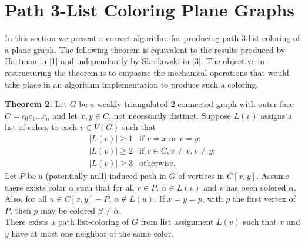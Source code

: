 \documentclass[12pt,a4paper]{article}
\begin{document}
\begin{comment}
  \node (1c2) at (1cm,1.25cm) {$c_2$};
  \node (1c3) at (2.25cm,1cm) {$c_3$};
  
  \node (c3) at (3.25cm,1cm) {$c_3$};
  \node (c4) at (4cm,0cm) {$c_4$};
  \node (c5) at (3.25cm,-1cm) {$c_5$};
  \node (c6) at (2cm,-1.25cm) {$c_6$};
  
  \node (2c6) at (1cm,-1.25cm) {$c_6$};
  \node (2c7) at (-0.25cm,-1cm) {$c_7$};
  
  \draw (0c1) -- (0c2); \draw (1c2) -- (1c3); \draw (c3) -- (c4) -- (c5) -- (c6) -- (c3);
  \draw (2c6) -- (2c7); \draw (c3)-- (c5) [dashed];
\end{tikzpicture}
\hfill\\
\hfill\\
\footnotesize{Removing $c_0$ and disecting into blocks with Theorem 2.}
\end{center}
\end{adjustwidth}
\hfill

\noindent Note that when applying Theorem 2, $G-c_0$ is $2$-connected
(i.e. $G-c_0=G_0$) if and only if Theorem 1 applies.

\end{comment}

\section*{Path 3-List Coloring Plane Graphs}

In this section we present a correct algorithm for producing path $3$-list coloring of a plane graph. The following
theorem is equivalent to the results produced by Hartman in [1] and independantly by Skrekovski in [3]. The objective in restructuring
the theorem is to empasize the mechanical operations that would take place in an algorithm implementation
to produce such a coloring.\\

\begin{adjustwidth}{2em}{2em}
\noindent\textbf{Theorem 2.} Let $G$ be a weakly triangulated $2$-connected graph with outer face $C=c_0c_1\ldots c_{n}$
and let $x,y\in C$, not necessarily distinct.
Suppose $L(v)$ assigns a list of colors to each $v\in V(G)$ such that
\[
    \begin{array}{ll}
	    |L(v)|\ge 1 & \text{if } v=x \text{ or } v=y;\\
	    |L(v)|\ge 2 & \text{if } v\in C, v\ne x, v\ne y;\\
	    |L(v)|\ge 3 & \text{otherwise.}
    \end{array}
\]
Let $P$ be a (potentially null) induced path in $G$ of vertices in $C[x,y]$. Assume
there exists color $\alpha$ such that for all $v\in P$, $\alpha\in L(v)$ and $v$ has been colored $\alpha$. Also,
for all $u\in C[x,y]-P$, $\alpha\not\in L(u)$. If $x=y=p$, with $p$ the first vertex of $P$,
then $p$ may be colored $\beta\ne\alpha$.\\

\noindent There exists a path list-coloring of $G$ from list assignment $L(v)$ such that $x$ and $y$ have at
most one neighbor of the same color.\\
\end{adjustwidth}
\end{document}
